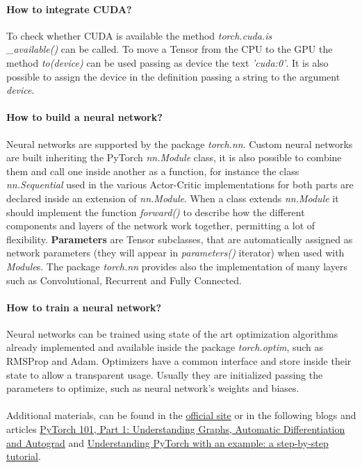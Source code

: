 \documentclass[11pt, a4paper, hidelinks]{report}
\begin{document}
\paragraph{How to integrate CUDA?}\label{par:how-to-integrate-cuda?}
To check whether CUDA is available the method \textit{torch.cuda.is\\\_available()} can be called.
To move a Tensor from the CPU to the GPU the method \textit{to(device)} can be used passing as device the text \textit{'cuda:0'}.
It is also possible to assign the device in the definition passing a string to the argument \textit{device}.

\paragraph{How to build a neural network?}\label{par:how-to-build-a-neural-network?}
Neural networks are supported by the package \textit{torch.nn}.
Custom neural networks are built inheriting the PyTorch \textit{nn.Module} class, it is also possible to combine them and call one inside another as a function, for instance the class \textit{nn.Sequential} used in the various Actor-Critic implementations for both parts are declared inside an extension of \textit{nn.Module}.
When a class extends \textit{nn.Module} it should implement the function \textit{forward()} to describe how the different components and layers of the network work together, permitting a lot of flexibility.
\textbf{Parameters} are Tensor subclasses, that are automatically assigned as network parameters (they will appear in \textit{parameters()} iterator) when used with \textit{Module}s.
The package \textit{torch.nn} provides also the implementation of many layers such as Convolutional, Recurrent and Fully Connected.

\paragraph{How to train a neural network?}\label{par:how-to-train-a-neural-network?}
Neural networks can be trained using state of the art optimization algorithms already implemented and available inside the package \textit{torch.optim}, such as RMSProp and Adam.
Optimizers have a common interface and store inside their state to allow a transparent usage.
Usually they are initialized passing the parameters to optimize, such as neural network's weights and biases.
\\
\\
Additional materials, can be found in the \href{https://pytorch.org/resources/}{official site} or in the following blogs and articles \href{https://blog.paperspace.com/pytorch-101-understanding-graphs-and-automatic-differentiation/}{PyTorch 101, Part 1: Understanding Graphs, Automatic Differentiation and Autograd} and \href{https://towardsdatascience.com/understanding-pytorch-with-an-example-a-step-by-step-tutorial-81fc5f8c4e8e}{Understanding PyTorch with an example: a step-by-step tutorial}.
\end{document}
